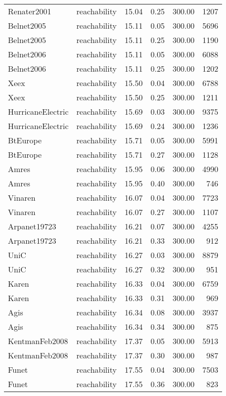 \begin{tabular}{llrrrr}
Renater2001 & reachability & 15.04 & 0.25 & 300.00 & 1207 \\
Belnet2005 & reachability & 15.11 & 0.05 & 300.00 & 5696 \\
Belnet2005 & reachability & 15.11 & 0.25 & 300.00 & 1190 \\
Belnet2006 & reachability & 15.11 & 0.05 & 300.00 & 6088 \\
Belnet2006 & reachability & 15.11 & 0.25 & 300.00 & 1202 \\
Xeex & reachability & 15.50 & 0.04 & 300.00 & 6788 \\
Xeex & reachability & 15.50 & 0.25 & 300.00 & 1211 \\
HurricaneElectric & reachability & 15.69 & 0.03 & 300.00 & 9375 \\
HurricaneElectric & reachability & 15.69 & 0.24 & 300.00 & 1236 \\
BtEurope & reachability & 15.71 & 0.05 & 300.00 & 5991 \\
BtEurope & reachability & 15.71 & 0.27 & 300.00 & 1128 \\
Amres & reachability & 15.95 & 0.06 & 300.00 & 4990 \\
Amres & reachability & 15.95 & 0.40 & 300.00 & 746 \\
Vinaren & reachability & 16.07 & 0.04 & 300.00 & 7723 \\
Vinaren & reachability & 16.07 & 0.27 & 300.00 & 1107 \\
Arpanet19723 & reachability & 16.21 & 0.07 & 300.00 & 4255 \\
Arpanet19723 & reachability & 16.21 & 0.33 & 300.00 & 912 \\
UniC & reachability & 16.27 & 0.03 & 300.00 & 8879 \\
UniC & reachability & 16.27 & 0.32 & 300.00 & 951 \\
Karen & reachability & 16.33 & 0.04 & 300.00 & 6759 \\
Karen & reachability & 16.33 & 0.31 & 300.00 & 969 \\
Agis & reachability & 16.34 & 0.08 & 300.00 & 3937 \\
Agis & reachability & 16.34 & 0.34 & 300.00 & 875 \\
KentmanFeb2008 & reachability & 17.37 & 0.05 & 300.00 & 5913 \\
KentmanFeb2008 & reachability & 17.37 & 0.30 & 300.00 & 987 \\
Funet & reachability & 17.55 & 0.04 & 300.00 & 7503 \\
Funet & reachability & 17.55 & 0.36 & 300.00 & 823 \\

\end{tabular}
